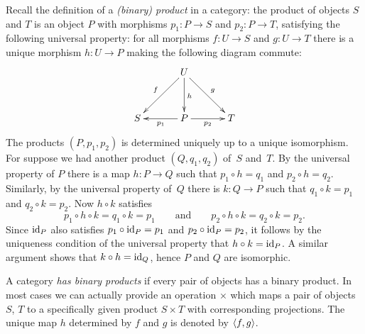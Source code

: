 Recall the definition of a \emph{(binary) product} in a category: the
product of objects $S$ and $T$ is an object $P$ with morphisms $p_1 :
P \to S$ and $p_2 : P \to T$, satisfying the following universal
property: for all morphisms $f : U \to S$ and $g : U \to T$ there is a
unique morphism $h : U \to P$ making the following diagram commute:
%
\begin{equation*}
  \xymatrix@+1em{
    &
    {U}
    \ar[ld]_{f}
    \ar[d]^h
    \ar[rd]^{g}
    &
    \\
    {S}
    &
    {P}
    \ar[l]^{p_1}
    \ar[r]_{p_2}
    &
    {T}
  }
\end{equation*}
%
The products $(P, p_1, p_2)$ is determined uniquely up to a unique
isomorphism. For suppose we had another product $(Q, q_1, q_2)$ of~$S$
and~$T$. By the universal property of $P$ there is a map $h : P \to Q$
such that $p_1 \circ h = q_1$ and $p_2 \circ h = q_2$. Similarly, by
the universal property of~$Q$ there is $k : Q \to P$ such that $q_1
\circ k = p_1$ and $q_2 \circ k = p_2$. Now $h \circ k$ satisfies
%
\begin{equation*}
  p_1 \circ h \circ k = q_1 \circ k = p_1
  \qquad\text{and}\qquad
  p_2 \circ h \circ k = q_2 \circ k = p_2.
\end{equation*}
%
Since $\mathrm{id}_P$ also satisfies $p_1 \circ \mathrm{id}_P = p_1$ and $p_2 \circ
\mathrm{id}_P = p_2$, it follows by the uniqueness condition of the universal
property that $h \circ k = \mathrm{id}_P$. A similar argument shows that $k
\circ h = \mathrm{id}_Q$, hence $P$ and $Q$ are isomorphic.

A category \emph{has binary products} if every pair of objects has a
binary product. In most cases we can actually provide an operation
$\times$ which maps a pair of objects $S$, $T$ to a specifically given
product $S \times T$ with corresponding projections. The unique map
$h$ determined by $f$ and $g$ is denoted by $\langle f,g \rangle$.

